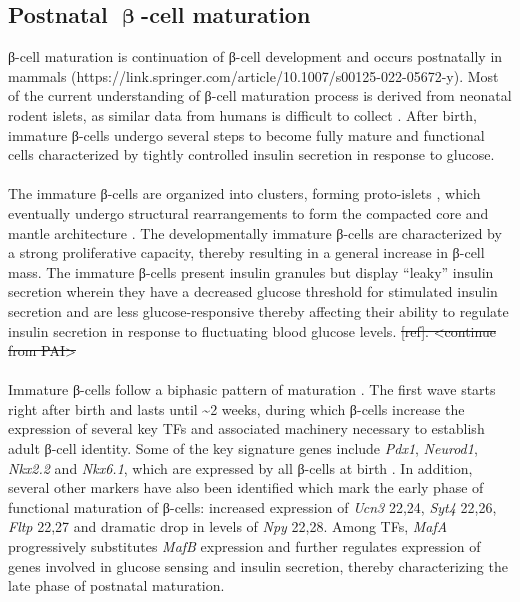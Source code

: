 \subsection{Postnatal \( \mathbf{\upbeta} \)-cell maturation} %
\label{sec:betamat}
β-cell maturation is continuation of β-cell development and occurs postnatally in mammals (https://link.springer.com/article/10.1007/s00125-022-05672-y). Most of the current understanding of β-cell maturation process is derived from neonatal rodent islets, as similar data from humans is difficult to collect \textbf{\cite{liu_all_2017, salinno_-cell_2019}}. After birth, immature β-cells undergo several steps to become fully mature and functional cells characterized by tightly controlled insulin secretion in response to glucose.
\\\\
The immature β-cells are organized into clusters, forming proto-islets \textbf{\cite{salinno_-cell_2019}}, which eventually undergo structural rearrangements to form the compacted core and mantle architecture \textbf{\cite{sharon_peninsular_2019}}. The developmentally immature β-cells are characterized by a strong proliferative capacity, thereby resulting in a general increase in β-cell mass. The immature β-cells present insulin granules but display “leaky” insulin secretion wherein they have a decreased glucose threshold for stimulated insulin secretion \textbf{\cite{liu_all_2017, blum_functional_2012}} and are less glucose-responsive thereby affecting their ability to regulate insulin secretion in response to fluctuating blood glucose levels. \st{[ref]. <continue from PAI>}
\\\\
Immature β-cells follow a biphasic pattern of maturation \textbf{\cite{salinno_-cell_2019, stolovich-rain_weaning_2015}}.  The first wave starts right after birth and lasts until \textasciitilde 2 weeks, during which β-cells increase the expression of several key TFs and associated machinery necessary to establish adult β-cell identity. Some of the key signature genes include \textit{Pdx1}, \textit{Neurod1}, \textit{Nkx2.2} and \textit{Nkx6.1}, which are expressed by all β-cells at birth \textbf{\cite{salinno_-cell_2019}}. In addition, several other markers have also been identified which mark the early phase of functional maturation of β-cells: increased expression of \textit{Ucn3} 22,24, \textit{Syt4} 22,26, \textit{Fltp} 22,27  and dramatic drop in levels of \textit{Npy} 22,28. Among TFs, \textit{MafA} progressively substitutes \textit{MafB} expression and further regulates expression of genes involved in glucose sensing and insulin secretion, thereby characterizing the late phase of postnatal maturation.
